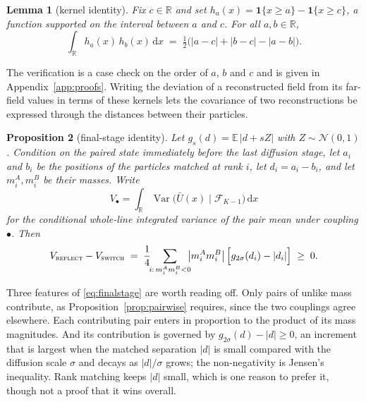 \documentclass[smallextended,nospthms]{svjour3}
\theoremstyle{plain}
\newtheorem{proposition}{Proposition}[section]
\newtheorem{lemma}[proposition]{Lemma}
\theoremstyle{definition}
\theoremstyle{remark}
\numberwithin{equation}{section}
\newcommand{\E}{\mathbb{E}}
\newcommand{\Var}{\operatorname{Var}}
\newcommand{\R}{\mathbb{R}}
\newcommand{\ind}{\mathbf{1}}
\newcommand{\Fil}{\mathcal{F}}
\newcommand{\refl}{\textnormal{\textsc{reflect}}}
\newcommand{\swi}{\textnormal{\textsc{switch}}}
\begin{document}
\begin{lemma}[kernel identity]
\label{lem:wholeline}
Fix $c\in\R$ and set $h_a(x)=\ind\{x\ge a\}-\ind\{x\ge c\}$, a function
supported on the interval between $a$ and $c$. For all $a,b\in\R$,
\begin{equation}
  \int_{\R}h_a(x)\,h_b(x)\,\mathrm dx
  \;=\;\tfrac12\bigl(|a-c|+|b-c|-|a-b|\bigr).
  \label{eq:kernel}
\end{equation}
\end{lemma}

The verification is a case check on the order of $a$, $b$ and $c$ and is given
in Appendix~\ref{app:proofs}. Writing the deviation of a reconstructed field
from its far-field values in terms of these kernels lets the covariance of two
reconstructions be expressed through the distances between their particles.

\begin{proposition}[final-stage identity]
\label{prop:finalstage}
Let $g_s(d)=\E\,|d+sZ|$ with $Z\sim\mathcal N(0,1)$. Condition on the paired
state immediately before the last diffusion stage, let $a_i$ and $b_i$ be the
positions of the particles matched at rank $i$, let $d_i=a_i-b_i$, and let
$m^A_i,m^B_i$ be their masses. Write
\[
 V_{\bullet}=\int_{\R}\Var\bigl(\bar U(x)\mid\Fil_{K-1}\bigr)\,\mathrm dx
\]
for the conditional whole-line integrated variance of the pair mean under
coupling $\bullet$. Then
\begin{equation}
  V_{\refl}-V_{\swi}
  \;=\;\frac14\!\!\sum_{i:\,m^A_i m^B_i<0}\!\!
    \bigl|m^A_i m^B_i\bigr|\,
    \Bigl[g_{2\sigma}(d_i)-|d_i|\Bigr]\;\ge\;0 .
  \label{eq:finalstage}
\end{equation}
\end{proposition}

Three features of \eqref{eq:finalstage} are worth reading off. Only pairs of
unlike mass contribute, as Proposition~\ref{prop:pairwise} requires, since the
two couplings agree elsewhere. Each contributing pair enters in proportion to
the product of its mass magnitudes. And its contribution is governed by
$g_{2\sigma}(d)-|d|\ge0$, an increment that is largest when the matched
separation $|d|$ is small compared with the diffusion scale $\sigma$ and decays
as $|d|/\sigma$ grows; the non-negativity is Jensen's inequality. Rank matching
keeps $|d|$ small, which is one reason to prefer it, though not a proof that it
wins overall.
\end{document}
